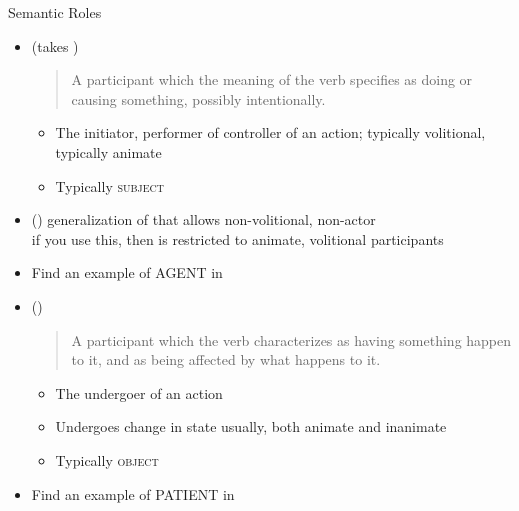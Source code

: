 \begin{frame}[allowframebreaks]{Semantic Roles}
\begin{itemize}
\item {} (takes )
  \begin{quote}
    A participant which the meaning of the verb specifies as doing or causing something,
    possibly intentionally. 
  \end{quote}
  \begin{itemize}
  \item The initiator, performer of controller of an action; typically volitional, typically animate
  \item Typically \textsc{subject}
  \end{itemize}
  \begin{exe}
      \ex{}
      \ex{}
      \ex{}
    \end{exe}
\item () generalization of  that allows non-volitional, non-actor
  \\ if you use this, then  is restricted to animate, volitional participants
\item Find an example of AGENT in \Story{}\task
\framebreak
\item  {} ()
  \begin{quote}
    A participant which the verb characterizes as having something
    happen to it, and as being affected by what happens to it.
  \end{quote}
  \begin{itemize}
  \item The undergoer of an action
  \item  Undergoes change in state usually, both animate and 
    inanimate
  \item Typically \textsc{object}
  \end{itemize}
  \begin{exe}
    \ex{}
    \ex{}
    \ex{}
    \ex{}
  \end{exe}
\item Find an example of PATIENT in \Story{}\task

\end{itemize}
\end{frame}
